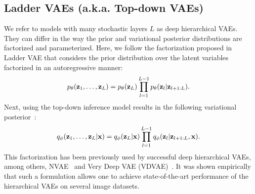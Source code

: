 \subsection{Ladder VAEs (a.k.a. Top-down VAEs)} \label{sec:hierarchical_vae}
We refer to models with many stochastic layers $L$ as deep hierarchical VAEs. They can differ in the way the prior and variational posterior distributions are factorized and parameterized. Here, we follow the factorization proposed in Ladder VAE \citep{sonderby2016ladder} that considers the prior distribution over the latent variables factorized in an autoregressive manner:
\begin{equation}
 p_{\theta}({\mathbf{z}}_1, \ldots, {\mathbf{z}}_L) = p_{\theta}({\mathbf{z}}_L)\prod_{l=1}^{L-1}{p_{\theta}({\mathbf{z}}_{l}|{\mathbf{z}}_{l+1:L})} .
\end{equation}
Next, using the top-down inference model results in the following variational posterior~\citep{sonderby2016ladder}: 
\begin{equation}
{q_{\phi}({\mathbf{z}}_1, \ldots, {\mathbf{z}}_L|{\mathbf{x}})} = {q_{\phi}({\mathbf{z}}_L|{\mathbf{x}})}\prod_{l=1}^{L-1}{q_{\phi}({\mathbf{z}}_l|{\mathbf{z}}_{l+1:L}, {\mathbf{x}})}.    
\end{equation}
This factorization has been previously used by successful deep hierarchical VAEs, among others, 
NVAE~\citep{vahdat2020nvae} and Very Deep VAE (VDVAE)~\citep{Child2020-ze}. It was shown empirically that such a formulation allows one to achieve state-of-the-art performance of the hierarchical VAEs on several image datasets. 